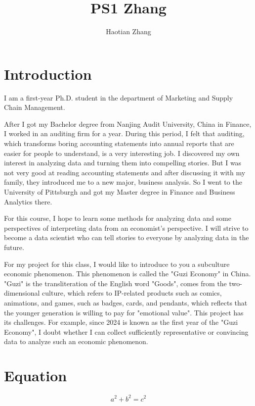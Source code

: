 \documentclass{article}
\title{PS1 Zhang}
\author{Haotian Zhang}
\begin{document}
\maketitle

\section{Introduction}

I am a first-year Ph.D. student in the department of Marketing and Supply Chain Management. 

After I got my Bachelor degree from Nanjing Audit University, China in Finance, I worked in an auditing firm for a year. During this period, I felt that auditing, which transforms boring accounting statements into annual reports that are easier for people to understand, is a very interesting job. I discovered my own interest in analyzing data and turning them into compelling stories. But I was not very good at reading accounting statements and after discussing it with my family, they introduced me to a new major, business analysis. So I went to the University of Pittsburgh and got my Master degree in Finance and Business Analytics there. 

For this course, I hope to learn some methods for analyzing data and some perspectives of interpreting data from an economist's perspective. I will strive to become a data scientist who can tell stories to everyone by analyzing data in the future.

For my project for this class, I would like to introduce to you a subculture economic phenomenon. This phenomenon is called the "Guzi Economy" in China. "Guzi" is the transliteration of the English word "Goods", comes from the two-dimensional culture, which refers to IP-related products such as comics, animations, and games, such as badges, cards, and pendants, which reflects that the younger generation is willing to pay for "emotional value". This project has its challenges. For example, since 2024 is known as the first year of the "Guzi Economy", I doubt whether I can collect sufficiently representative or convincing data to analyze such an economic phenomenon. 

\section{Equation}

\[ a^2 + b^2 = c^2 \]
\end{document}
